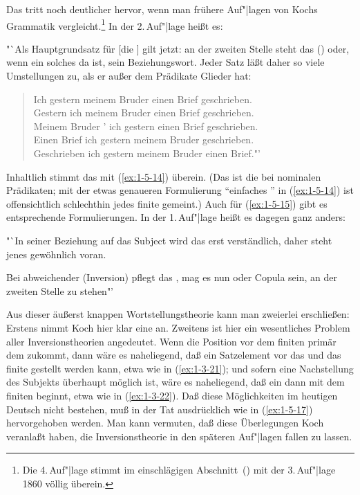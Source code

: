 \documentclass[output=paper]{langsci/langscibook}
\begin{document}
Das tritt noch deutlicher hervor, wenn man frühere Auf"|lagen von Kochs Grammatik
vergleicht.\footnote{%
  Die 4.\,Auf"|lage stimmt im einschlägigen Abschnitt~(\citeyear[239f, §425f]{Koch1862}) mit der 3.\,Auf"|lage 1860
  völlig überein.%
}
In der 2.\,Auf"|lage heißt es:
\begin{exe}
\ex
"`Als Hauptgrundsatz für [die ] gilt jetzt: an der zweiten Stelle
steht das ()  oder, wenn ein solches da ist, sein
Beziehungswort. Jeder Satz läßt daher so viele Umstellungen zu, als er
außer dem Prädikate Glieder hat:
\begin{quotation}
Ich  gestern meinem Bruder einen Brief geschrieben. \\
Gestern  ich meinem Bruder einen Brief geschrieben. \\
Meinem Bruder ' ich gestern einen Brief geschrieben. \\
Einen Brief  ich gestern meinem Bruder geschrieben. \\
Geschrieben  ich gestern meinem Bruder einen Brief."'
\end{quotation}
\citep[187, §392]{Koch1854}
\end{exe}
Inhaltlich stimmt das mit (\ref{ex:1-5-14}) überein. (Das  ist die  bei
nominalen Prädikaten; mit der etwas genaueren Formulierung "`einfaches "' in
(\ref{ex:1-5-14}) ist offensichtlich schlechthin jedes finite  gemeint.) Auch für (\ref{ex:1-5-15}) gibt es entsprechende Formulierungen. In der 1.\,Auf"|lage heißt es dagegen ganz anders:
\begin{exe}
\ex\label{ex:1-5-17}
"`In seiner Beziehung auf das Subject wird das  erst verständlich, daher steht jenes gewöhnlich voran.

Bei abweichender  (Inversion) pflegt das , mag es nun
 oder Copula sein, an der zweiten Stelle zu stehen"'
\citep[137f, §246]{Koch1848}
\end{exe}
Aus dieser äußerst knappen Wortstellungstheorie kann man zweierlei erschließen:
Erstens nimmt Koch hier klar eine  an. Zweitens ist hier ein wesentliches Problem aller Inversionstheorien angedeutet. Wenn die Position vor dem finiten  primär dem  zukommt, dann wäre es naheliegend, daß ein Satzelement vor das  und das finite  gestellt werden kann, etwa wie in (\ref{ex:1-3-21});
und sofern eine Nachstellung des Subjekts überhaupt möglich ist, wäre es naheliegend, daß ein  dann mit dem finiten  beginnt, etwa wie in (\ref{ex:1-3-22}). Daß diese Möglichkeiten im heutigen Deutsch nicht bestehen, muß in der Tat ausdrücklich wie in (\ref{ex:1-5-17}) hervorgehoben werden. Man kann vermuten, daß diese Überlegungen Koch veranlaßt haben, die Inversionstheorie in den späteren Auf"|lagen fallen zu lassen.
\end{document}
